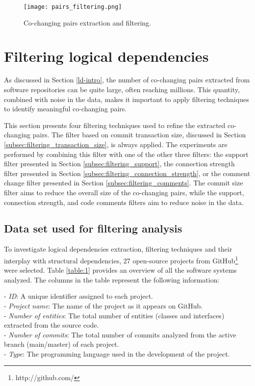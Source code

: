 \begin{figure}[H]
\centering
\texttt{[image: pairs\_filtering.png]}
\caption{Co-changing pairs extraction and filtering.}
\label{fig:figfiltering}
\end{figure}



\section{Filtering logical dependencies}
\label{sec:filtering_logical_dependencies}

\hspace{4em}As discussed in Section \ref{ld-intro}, the number of co-changing pairs extracted from software repositories can be quite large, often reaching millions. This quantity, combined with noise in the data, makes it important to apply filtering techniques to identify meaningful co-changing pairs.

This section presents four filtering techniques used to refine the extracted co-changing pairs. The filter based on commit transaction size, discussed in Section \ref{subsec:filtering_transaction_size}, is always applied. The experiments are performed by combining this filter with one of the other three filters: the support filter presented in Section \ref{subsec:filtering_support}, the connection strength filter presented in Section \ref{subsec:filtering_connection_strength}, or the comment change filter presented in Section \ref{subsec:filtering_comments}. The commit size filter aims to reduce the overall size of the co-changing pairs, while the support, connection strength, and code comments filters aim to reduce noise in the data.


\subsection{Data set used for filtering analysis}
\label{subsec:data_sets_used}

\hspace{4em}To investigate logical dependencies extraction, filtering techniques and their interplay with structural dependencies, 27 open-source projects from GitHub\footnote{http://github.com/} were selected. Table \ref{table:1} provides an overview of all the software systems analyzed. The columns in the table represent the following information:

\hspace{-4em}- \textit{ID}: A unique identifier assigned to each project. \\
- \textit{Project name}: The name of the project as it appears on GitHub. \\
- \textit{Number of entities}: The total number of entities (classes and interfaces) extracted from the source code. \\
- \textit{Number of commits}: The total number of commits analyzed from the active branch (main/master) of each project. \\
- \textit{Type}: The programming language used in the development of the project.


